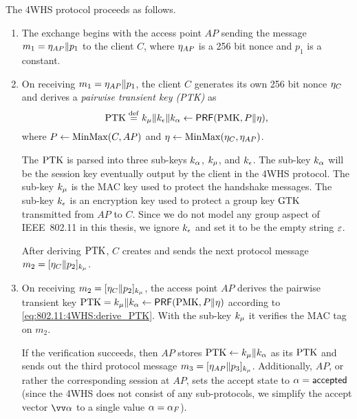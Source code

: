 The 4WHS protocol proceeds as follows.



\begin{enumerate}
	\item  The exchange begins with the access point $AP$ sending the message $m_1 = \eta_{AP} \| p_1$ to the client $C$,
	where $\eta_{AP}$ is a 256 bit nonce and $p_1$ is a constant.
	
	\item On receiving $m_1 = \eta_{AP} \| p_1$, 
	the client $C$ generates its own 256 bit nonce $\eta_C$
	and derives a  \emph{pairwise transient key (PTK)} as
	\begin{equation}\label{eq:802.11:4WHS:derive_PTK}
		\mathrm{PTK} \overset{\mathrm{def}}{=} k_\mu \| k_\epsilon \| k_\alpha \gets \mathsf{PRF}(\mathrm{PMK}, P \| \eta) ,
	\end{equation}
	where 
	$P \gets \operatorname{MinMax}(C, AP)$
	and
	$\eta \gets  \operatorname{MinMax}(\eta_{C}, \eta_{AP})$. 

	The $\mathrm{PTK}$ is parsed into three sub-keys $k_\alpha$,  $k_\mu$, and $k_\epsilon$.
	The sub-key $k_\alpha$ will be the session key eventually output by the client in the 4WHS protocol.
	The sub-key $k_\mu$ is the MAC key used to protect the handshake messages.
	The sub-key $k_\epsilon$	is an encryption key used to protect a group key $\mathrm{GTK}$ transmitted from $AP$ to $C$.
	Since we do not model any group aspect of IEEE~802.11 in this thesis,
	we ignore $k_\epsilon$ and set it to be the empty string $\varepsilon$.
	
	
	After deriving $\mathrm{PTK}$,
	$C$ creates and sends the next protocol message $m_2 = [\eta_C \| p_2]_{k_\mu}$.
	
	\item On receiving $m_2 = [\eta_C \| p_2]_{k_\mu}$,
	the access point $AP$ derives the pairwise transient key $\mathrm{PTK} = k_\mu \| k_\alpha \gets \mathsf{PRF}(\mathrm{PMK}, P \| \eta)$ according to \cref{eq:802.11:4WHS:derive_PTK}.
	With the sub-key $k_\mu$ it verifies the MAC tag on $m_2$.
	
	If the verification succeeds,
	then $AP$ stores $\mathrm{PTK} \gets k_{\mu} \| k_\alpha$ as its $\mathrm{PTK}$ 
	and sends out the third protocol message $m_3 = [\eta_{AP} \| p_3]_{k_\mu}$.
	Additionally,
	$AP$,
	or rather the corresponding session at $AP$,
	sets the accept state to $\alpha = \mathsf{accepted}$
	(since the 4WHS does not consist of any sub-protocols, we simplify the accept vector $\vrunstate$ to a single value $\alpha = \alpha_F$).
	

\end{enumerate}
